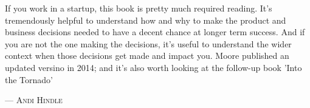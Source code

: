 If you work in a startup, this book is pretty much required reading.  It's tremendously helpful to understand how and why to make the product and business decisions needed to have a decent chance at longer term success.
  And if you are not the one making the decisions, it's useful to understand the wider context when those decisions get made and impact you.  Moore published an updated versino in 2014; and it's also worth looking at the follow-up book 'Into the Tornado'
\setlength{\parindent}{0cm}\par\textsc{ --- Andi Hindle }\par\vspace{12pt}\setlength{\parindent}{15pt}
